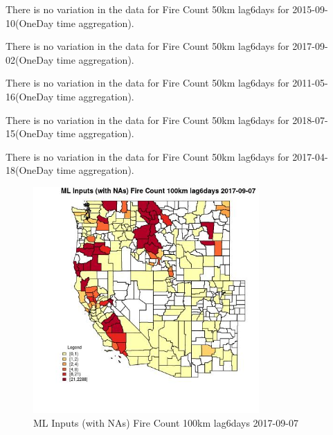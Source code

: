 There is no variation in the data for Fire Count 50km lag6days for 2015-09-10(OneDay time aggregation). 
 

There is no variation in the data for Fire Count 50km lag6days for 2017-09-02(OneDay time aggregation). 
 

There is no variation in the data for Fire Count 50km lag6days for 2011-05-16(OneDay time aggregation). 
 

There is no variation in the data for Fire Count 50km lag6days for 2018-07-15(OneDay time aggregation). 
 

There is no variation in the data for Fire Count 50km lag6days for 2017-04-18(OneDay time aggregation). 
 

\begin{figure} 
\centering  
\includegraphics[width=0.77\textwidth]{Code_Outputs/Report_ML_input_PM25_Step4_part_e_de_duplicated_aves_compiled_2019-05-21wNAs_CountyFire_Count_100km_lag6daysMean2017-09-07.jpg} 
\caption{\label{fig:Report_ML_input_PM25_Step4_part_e_de_duplicated_aves_compiled_2019-05-21wNAsCountyFire_Count_100km_lag6daysMean2017-09-07}ML Inputs (with NAs) Fire Count 100km lag6days 2017-09-07} 
\end{figure} 
 

